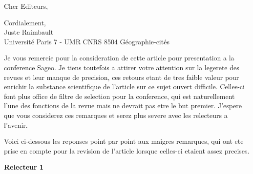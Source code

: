\documentclass[11pt,a4paper,sans]{moderncv}        %
\begin{document}
\date{\today}
\opening{Cher Editeurs,}
\closing{Cordialement,\\
Juste Raimbault\\
Université Paris 7 - UMR CNRS 8504 Géographie-cités
}
\makelettertitle

\justify
\justify


Je vous remercie pour la consideration de cette article pour presentation a la conference Sageo. Je tiens toutefois a attirer votre attention sur la legerete des revues et leur manque de precision, ces retours etant de tres faible valeur pour enrichir la substance scientifique de l'article sur ce sujet ouvert difficile. Celles-ci font plus office de filtre de selection pour la conference, qui est naturellement l'une des fonctions de la revue mais ne devrait pas etre le but premier. J'espere que vous considerez ces remarques et serez plus severe avec les relecteurs a l'avenir.

Voici ci-dessous les reponses point par point aux maigres remarques, qui ont ete prise en compte pour la revision de l'article lorsque celles-ci etaient assez precises.


\textbf{Relecteur 1}
\end{document}
